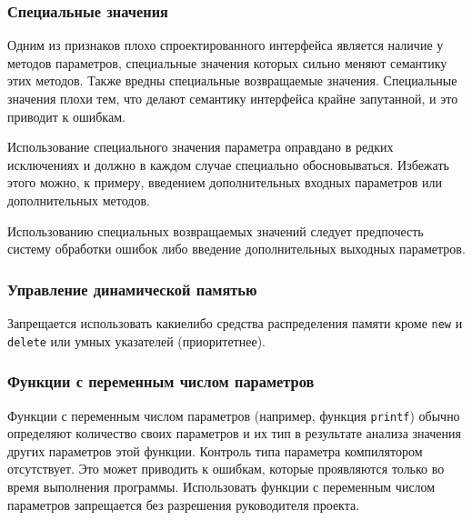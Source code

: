 {{{%
\newpage
\subsubsection{Специальные значения}

Одним из признаков плохо спроектированного интерфейса является наличие у методов параметров, специальные значения которых сильно меняют семантику этих методов. Также вредны специальные возвращаемые значения. Специальные значения плохи тем, что делают семантику интерфейса крайне запутанной, и это приводит к ошибкам. 

Использование специального значения параметра оправдано в редких исключениях и должно в каждом случае специально обосновываться. Избежать этого можно, к примеру, введением дополнительных входных параметров или дополнительных методов.

Использованию специальных возвращаемых значений следует предпочесть систему обработки ошибок либо введение дополнительных выходных параметров.

\subsubsection{Управление динамической памятью}

Запрещается использовать какие\sdash либо средства распределения памяти кроме \lstinline|new| и \lstinline|delete| или умных указателей (приоритетнее).


\subsubsection{Функции с переменным числом параметров}

Функции с переменным числом параметров (например, функция \lstinline|printf|) обычно определяют количество своих параметров и их тип в результате анализа значения других параметров этой функции. Контроль типа параметра компилятором отсутствует. Это может приводить к ошибкам, которые проявляются только во время выполнения программы. Использовать функции с переменным числом параметров запрещается без разрешения руководителя проекта.

}}}
